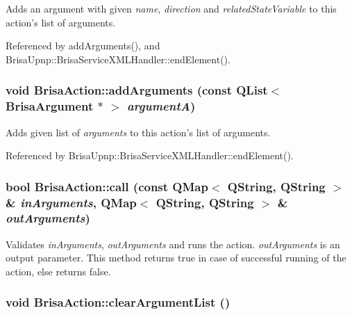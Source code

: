 Adds an argument with given {\itshape name\/}, {\itshape direction\/} and {\itshape relatedStateVariable\/} to this action's list of arguments. 

Referenced by addArguments(), and BrisaUpnp::BrisaServiceXMLHandler::endElement().\hypertarget{classBrisaUpnp_1_1BrisaAction_a006f4ddaab49e8935d531fef07e44129}{
\subsubsection[{addArguments}]{\setlength{\rightskip}{0pt plus 5cm}void BrisaAction::addArguments (const QList$<$ {\bf BrisaArgument} $\ast$ $>$ {\em argumentA})}}
\label{classBrisaUpnp_1_1BrisaAction_a006f4ddaab49e8935d531fef07e44129}


Adds given list of {\itshape arguments\/} to this action's list of arguments. 

Referenced by BrisaUpnp::BrisaServiceXMLHandler::endElement().\hypertarget{classBrisaUpnp_1_1BrisaAction_a1a419879e79f7979377ef7a9ae1bfa9b}{
\subsubsection[{call}]{\setlength{\rightskip}{0pt plus 5cm}bool BrisaAction::call (const QMap$<$ QString, QString $>$ \& {\em inArguments}, \/  QMap$<$ QString, QString $>$ \& {\em outArguments})}}
\label{classBrisaUpnp_1_1BrisaAction_a1a419879e79f7979377ef7a9ae1bfa9b}


Validates {\itshape inArguments\/}, {\itshape outArguments\/} and runs the action. {\itshape outArguments\/} is an output parameter. This method returns true in case of successful running of the action, else returns false. \hypertarget{classBrisaUpnp_1_1BrisaAction_a21f3042b8aea2ab6e9ce0f4e5535be60}{
\subsubsection[{clearArgumentList}]{\setlength{\rightskip}{0pt plus 5cm}void BrisaAction::clearArgumentList ()}}
\label{classBrisaUpnp_1_1BrisaAction_a21f3042b8aea2ab6e9ce0f4e5535be60}


